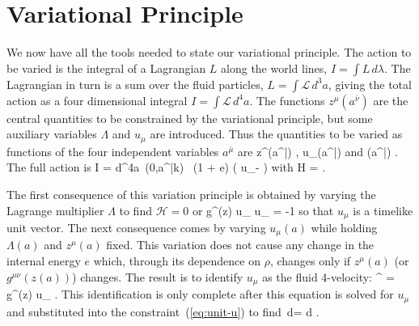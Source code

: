\section{Variational Principle}

We now have all the tools needed to state our variational
principle.
The action to be varied is the integral of a Lagrangian $L$ along
the world lines, $I = \int L\,d\lambda$.
The Lagrangian in turn is a sum over the fluid particles, $L =
\int {\mathcal L}\,d^3 a$, giving the total action as a four
dimensional integral $I = \int {\mathcal L}\,d^4 a$.
The functions $z^\mu(a^{\bar{\nu}})$ are the central quantities
to be constrained by the variational principle, but some
auxiliary variables $\Lambda$ and $u_\mu$ are introduced.
Thus the quantities to be varied as functions of the four
independent variables $a^{\bar{\mu}}$ are
\be
   z^\mu(a^{\bar{\nu}}) \quad , \quad u_\mu(a^{\bar{\nu}})
      \quad \mbox{and} \quad \Lambda(a^{\bar{\nu}}) \quad .
\ee
The full action is
\be\label{eq:action}
  I = \int \!d^4a\,
\rho(0,a^{\bar{k}})
   \,
 (1 + e) \left(  u_\mu - 
  \right)
\ee
with
\be
 {\mathcal H} =  \left[ g^{\mu\nu}(z) u_{\mu} u_{\nu}
                                    + 1 \right]
     \quad .
\ee

The first consequence of this variation principle is obtained by
varying the Lagrange multiplier $\Lambda$ to find ${\mathcal H} =
0$ or
\be\label{eq:unit-u}
     g^{\mu\nu}(z) u_{\mu} u_{\nu} = -1
\ee
so that $u_{\mu}$ is a timelike unit vector.
The next consequence comes by varying $u_{\mu} (a)$ while holding
$\Lambda (a)$ and $z^\mu (a)$ fixed.
This variation does not cause any change in the internal energy
$e$ which, through its dependence on $\rho$, changes only if
$z^\mu (a)$ (or $g^{\mu\nu}(z(a))$) changes.
The result is to identify $u_{\mu}$ as the fluid 4-velocity:
\be\label{eq:zdot}
   ^\mu \equiv {}
     = \Lambda g^{\mu\nu}(z) u_{\nu}
     \quad .
\ee
This identification is only complete after this equation is
solved for $u_\mu$ and substituted into the
constraint~(\ref{eq:unit-u}) to find
\be\label{eq:Lambda}
     \Lambda\,d\lambda = d\tau \equiv
     \quad .
\ee


